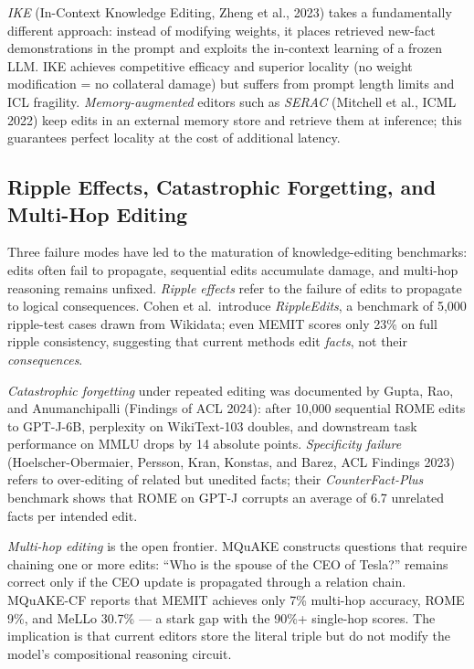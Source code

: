 \documentclass{article}
\begin{document}
\emph{IKE} (In-Context Knowledge Editing, Zheng et al., 2023) takes a fundamentally different approach: instead of modifying weights, it places retrieved new-fact demonstrations in the prompt and exploits the in-context learning of a frozen LLM. IKE achieves competitive efficacy and superior locality (no weight modification = no collateral damage) but suffers from prompt length limits and ICL fragility. \emph{Memory-augmented} editors such as \emph{SERAC} (Mitchell et al., ICML 2022) keep edits in an external memory store and retrieve them at inference; this guarantees perfect locality at the cost of additional latency.

\subsection{Ripple Effects, Catastrophic Forgetting, and Multi-Hop Editing}\label{ripple-effects-catastrophic-forgetting-and-multi-hop-editing}

Three failure modes have led to the maturation of knowledge-editing benchmarks: edits often fail to propagate, sequential edits accumulate damage, and multi-hop reasoning remains unfixed. \emph{Ripple effects} \citep{cohen2024evaluatingtherippl} refer to the failure of edits to propagate to logical consequences. Cohen et al.~introduce \emph{RippleEdits}, a benchmark of 5,000 ripple-test cases drawn from Wikidata; even MEMIT scores only 23\% on full ripple consistency, suggesting that current methods edit \emph{facts}, not their \emph{consequences}.

\emph{Catastrophic forgetting} under repeated editing was documented by Gupta, Rao, and Anumanchipalli (Findings of ACL 2024): after 10,000 sequential ROME edits to GPT-J-6B, perplexity on WikiText-103 doubles, and downstream task performance on MMLU drops by 14 absolute points. \emph{Specificity failure} (Hoelscher-Obermaier, Persson, Kran, Konstas, and Barez, ACL Findings 2023) refers to over-editing of related but unedited facts; their \emph{CounterFact-Plus} benchmark shows that ROME on GPT-J corrupts an average of 6.7 unrelated facts per intended edit.

\emph{Multi-hop editing} is the open frontier. MQuAKE \citep{zhong2023mquakeassessingkno} constructs questions that require chaining one or more edits: ``Who is the spouse of the CEO of Tesla?'' remains correct only if the CEO update is propagated through a relation chain. MQuAKE-CF reports that MEMIT achieves only 7\% multi-hop accuracy, ROME 9\%, and MeLLo 30.7\% --- a stark gap with the 90\%+ single-hop scores. The implication is that current editors store the literal triple but do not modify the model's compositional reasoning circuit.
\end{document}

